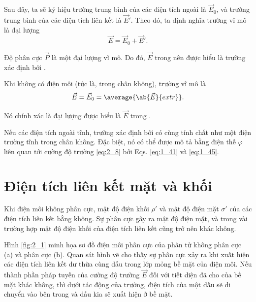 Sau đây, ta sẽ ký hiệu trường trung bình của các điện tích ngoài là $\vec{E}_0$, và trường trung bình của các điện tích liên kết là $\vec{E}'$. Theo đó, ta định nghĩa trường vĩ mô là đại lượng
\begin{equation}\label{eq:2_8}
    \vec{E} = \vec{E}_0 + \vec{E}'.
\end{equation}

Độ phân cực $\vec{P}$ là một đại lượng vĩ mô. Do đó, $\vec{E}$ trong  nên được hiểu là trường xác định bởi .

Khi không có điện môi (tức là, trong chân không), trường vĩ mô là
\begin{equation*}
    \vec{E} = \vec{E}_0 = \average{\ab{\vec{E}}{extr}}.
\end{equation*}

\noindent
Nó chính xác là đại lượng được hiểu là $\vec{E}$ trong .

Nếu các điện tích ngoài tĩnh, trường xác định bởi  có cùng tính chất như một điện trường tĩnh trong chân không. Đặc biệt, nó có thể được mô tả bằng điện thế $\varphi$ liên quan tới cường độ trường \eqref{eq:2_8} bởi Eqs. \eqref{eq:1_41} và \eqref{eq:1_45}.

\section{Điện tích liên kết mặt và khối}\label{sec:2_4}

Khi điện môi không phân cực, mật độ điện khối $\rho'$ và mật độ điện mặt $\sigma'$ của các điện tích liên kết bằng không. Sự phân cực gây ra mật độ điện mặt, và trong vài trường hợp mật độ điện khối của điện tích liên kết cũng trở nên khác không.

Hình \ref{fig:2_1} minh họa sơ đồ điện môi phân cực của phân tử không phân cực (a) và phân cực (b). Quan sát hình vẽ cho thấy sự phân cực xảy ra khi xuất hiện các điện tích liên kết dư thừa cùng dấu trong lớp mỏng bề mặt của điện môi. Nếu thành phần pháp tuyến của cường độ trường $\vec{E}$ đối với tiết diện đã cho của bề mặt khác không, thì dưới tác động của trường, điện tích của một dấu sẽ di chuyển vào bên trong và dấu kia sẽ xuất hiện ở bề mặt.

